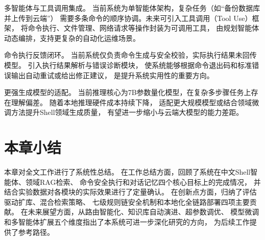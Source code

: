 多智能体与工具调用集成。
当前系统为单智能体架构，复杂任务（如“备份数据库并上传到云端”）
需要多条命令的顺序协调。未来可引入工具调用（Tool Use）框架，
将命令执行、文件管理、网络请求等操作封装为可调用工具，
由规划智能体动态编排，支持更复杂的自动化运维场景。

命令执行反馈闭环。
当前系统仅负责命令生成与安全校验，实际执行结果未回传模型。
引入执行结果解析与错误诊断模块，
使系统能够根据命令退出码和标准错误输出自动重试或给出修正建议，
是提升系统实用性的重要方向。

更强生成模型的适配。
当前推理核心为7B参数量化模型，在复杂多步骤任务上存在理解偏差。
随着本地推理硬件成本持续下降，
适配更大规模模型或结合领域微调方法提升Shell领域生成质量，
有望进一步缩小与云端大模型的能力差距。

\section{本章小结}

本章对全文工作进行了系统性总结。
在工作总结方面，回顾了系统在中文Shell智能体、领域RAG检索、
命令安全执行和对话记忆四个核心目标上的完成情况，
并结合实验数据对各模块的实际效果进行了定量确认。
在创新点方面，归纳了评估驱动扩库、混合检索策略、
七级规则链安全机制和本地化全链路部署四项主要贡献。
在未来展望方面，从路由智能化、知识库自动演进、超参数调优、
模型微调和多智能体扩展五个维度指出了本系统可进一步深化研究的方向，
为后续工作提供了参考路径。

